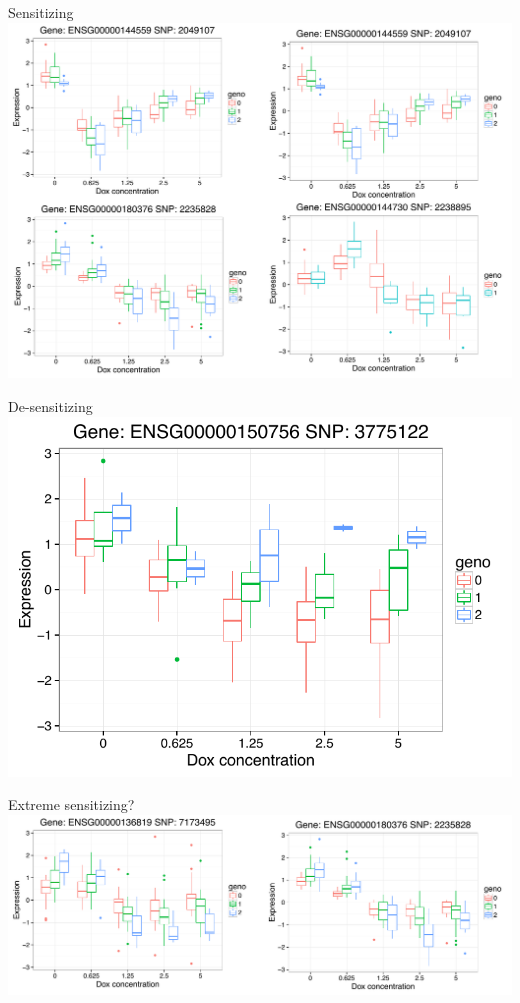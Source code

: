 \documentclass{beamer}
\begin{document}
\begin{frame}{Sensitizing}
\centering
\includegraphics[width=\textwidth,clip,trim=0 0 0 0]{../figures/iqtl_types/sensitizing.pdf}
\end{frame}

\begin{frame}{De-sensitizing}
\centering
\includegraphics[width=\textwidth,clip,trim=0 0 0 0]{../figures/iqtl_types/desensitizing.pdf}
\end{frame}

\begin{frame}{Extreme sensitizing?}
\centering
\includegraphics[width=\textwidth,clip,trim=0 0 0 0]{../figures/iqtl_types/extreme.pdf}
\end{frame}
\end{document}
